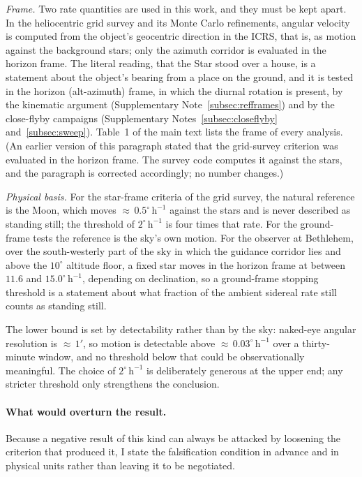 \documentclass[11pt,a4paper]{article}
\begin{document}
\textit{Frame.} Two rate quantities are used in this work, and they must be
kept apart. In the heliocentric grid survey and its Monte Carlo refinements,
angular velocity is computed from the object's geocentric direction in the
ICRS, that is, as motion against the background stars; only the azimuth
corridor is evaluated in the horizon frame. The literal reading, that the Star
stood over a house, is a statement about the object's bearing from a place on
the ground, and it is tested in the horizon (alt-azimuth) frame, in which the
diurnal rotation is present, by the kinematic argument
(Supplementary Note~\ref{subsec:refframes}) and by the close-flyby campaigns
(Supplementary Notes~\ref{subsec:closeflyby} and~\ref{subsec:sweep}). Table~1 of the main
text lists the frame of every analysis. (An earlier version of this paragraph
stated that the grid-survey criterion was evaluated in the horizon frame. The
survey code computes it against the stars, and the paragraph is corrected
accordingly; no number changes.)

\textit{Physical basis.} For the star-frame criteria of the grid survey, the
natural reference is the Moon, which moves ${\approx}\,0.5^\circ\,\mathrm{h}^{-1}$
against the stars and is never described as standing still; the threshold of
$2^\circ\,\mathrm{h}^{-1}$ is four times that rate. For the ground-frame tests
the reference is the sky's own motion. For the observer at Bethlehem, over the
south-westerly part of the sky in which the guidance corridor lies and above
the $10^\circ$ altitude floor, a fixed star moves in the horizon frame at
between $11.6$ and $15.0^\circ\,\mathrm{h}^{-1}$, depending on declination, so
a ground-frame stopping threshold is a statement about what fraction of the
ambient sidereal rate still counts as standing still.

The lower bound is set by detectability rather than by the sky: naked-eye
angular resolution is ${\approx}\,1'$, so motion is detectable above
${\approx}\,0.03^\circ\,\mathrm{h}^{-1}$ over a thirty-minute window, and no
threshold below that could be observationally meaningful. The choice of
$2^\circ\,\mathrm{h}^{-1}$ is deliberately generous at the upper end; any
stricter threshold only strengthens the conclusion.

\paragraph{What would overturn the result.}
Because a negative result of this kind can always be attacked by loosening the
criterion that produced it, I state the falsification condition in advance and
in physical units rather than leaving it to be negotiated.
\end{document}
